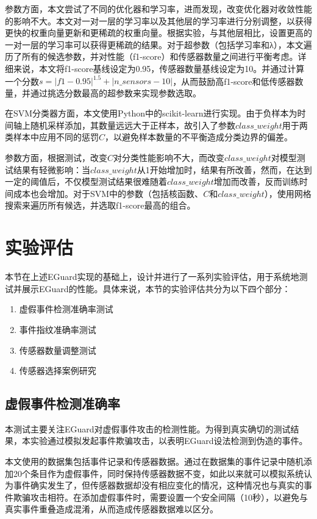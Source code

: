 参数方面，本文尝试了不同的优化器和学习率，进而发现，改变优化器对收敛性能的影响不大。本文对一对一层的学习率以及其他层的学习率进行分别调整，以获得更快的权重向量更新和更稀疏的权重向量。根据实验，与其他层相比，设置更高的一对一层的学习率可以获得更稀疏的结果。对于超参数（包括学习率和λ），本文遍历了所有的候选参数，并对性能（f1-score）和传感器数量之间进行平衡考虑。详细来说，本文将f1-score基线设定为0.95，传感器数量基线设定为10。并通过计算一个分数$s=|f1-0.95|^{1.5}+|n\_sensors-10|$，从而鼓励高f1-score和低传感器数量，并通过挑选分数最高的超参数来实现参数选取。

在SVM分类器方面，本文使用Python中的scikit-learn进行实现。由于负样本为时间轴上随机采样添加，其数量远远大于正样本，故引入了参数$class\_weight$用于两类样本中应用不同的惩罚$C$，以避免样本数量的不平衡造成分类边界的偏差。

参数方面，根据测试，改变$C$对分类性能影响不大，而改变$class\_weight$对模型测试结果有轻微影响：当$class\_weight$从1开始增加时，结果有所改善，然而，在达到一定的阈值后，不仅模型测试结果很难随着$class\_weight$增加而改善，反而训练时间成本也会增加。对于SVM中的参数（包括核函数、$C$和$class\_weight$），使用网格搜索来遍历所有候选，并选取f1-score最高的组合。

\section{实验评估}
\label{sec:eventveri_eval}
本节在上述EGuard实现的基础上，设计并进行了一系列实验评估，用于系统地测试并展示EGuard的性能。具体来说，本节的实验评估共分为以下四个部分：

\begin{enumerate}
	\item 虚假事件检测准确率测试
	\item 事件指纹准确率测试
	\item 传感器数量调整测试
	\item 传感器选择案例研究
\end{enumerate}

\subsection{虚假事件检测准确率}
\label{subsec:forged_events}
本测试主要关注EGuard对虚假事件攻击的检测性能。为得到真实确切的测试结果，本实验通过模拟发起事件欺骗攻击，以表明EGuard设法检测到伪造的事件。

本文使用的数据集包括事件记录和传感器数据。通过在数据集的事件记录中随机添加20个条目作为虚假事件，同时保持传感器数据不变，如此以来就可以模拟系统认为事件确实发生了，但传感器数据却没有相应变化的情况，这种情况也与真实的事件欺骗攻击相符。在添加虚假事件时，需要设置一个安全间隔（10秒），以避免与真实事件重叠造成混淆，从而造成传感器数据难以区分。

